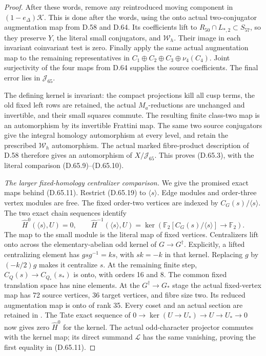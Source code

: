 \begin{proof}
After these words, remove any reintroduced moving component in
\((1-e_\Delta)\mathcal K\). This is done after the words, using the
onto actual two-conjugator augmentation map from D.58 and D.64.
Its coefficients lift to \(R_{50}\cap L_{*,2}\subset S_{57}\), so
they preserve \(Y\), the literal small conjugators, and
\(\mathcal W_h\). Their image in each invariant coinvariant test
is zero. Finally apply the same actual augmentation map to the
remaining representatives in
\(C_1\oplus C_2\oplus C_3\oplus\nu_4(C_4)\).
Joint surjectivity of the four maps from D.64 supplies the source
coefficients. The final error lies in \(\mathcal J_{65}\).

The defining kernel is invariant: the compact projections kill all
cusp terms, the old fixed left rows are retained, the actual
\(M_a\)-reductions are unchanged and invertible, and their small
squares commute. The resulting finite class-two map is an
automorphism by its invertible Frattini map. The same two source
conjugators give the integral homology automorphism at every level,
and retain the prescribed \(\mathcal W_h\) automorphism. The actual
marked fibre-product description of D.58 therefore gives an
automorphism of \(X/\mathcal J_{65}\). This proves (D.65.3), with
the literal comparison (D.65.9)--(D.65.10).

\emph{The larger fixed-homology centralizer comparison.}
We give the promised exact maps behind (D.65.11). Restrict
(D.65.19) to \(\langle s\rangle\). Edge modules and order-three
vertex modules are free. The fixed order-two vertices are indexed
by \(C_G(s)/\langle s\rangle\). The two exact chain sequences
identify
\[
 \widehat H^0(\langle s\rangle,U)=0,\qquad
 \widehat H^{-1}(\langle s\rangle,U)
   =\ker\left(\mathbb F_2[C_G(s)/\langle s\rangle]
                                    \longrightarrow\mathbb F_2\right).
 \tag{D.65.24}
\]
The map to the small module is the literal map of fixed vertices.
Centralizers lift onto across the elementary-abelian odd kernel of
\(G\to G^\dagger\). Explicitly, a lifted centralizing element has
\(gsg^{-1}=ks\), with \(sk=-k\) in that kernel. Replacing \(g\)
by \((-k/2)g\) makes it centralize \(s\). At the remaining finite step,
\(C_Q(s)\to C_{Q_*}(s_*)\) is onto, with orders 16 and 8.
The common fixed translation space has nine elements. At the
\(G^\dagger\to G_*\) stage the actual fixed-vertex map has 72 source
vertices, 36 target vertices, and fibre size two. Its reduced
augmentation map is onto of rank
35. Every coset and an actual section are retained in
. The Tate exact sequence of
\(0\to\ker(U\to U_*)\to U\to U_*\to0\) now gives zero
\(\widehat H^0\) for the kernel. The actual odd-character projector
commutes with the kernel map; its direct summand \(\mathcal L\)
has the same vanishing, proving the first equality
in (D.65.11).


\end{proof}
